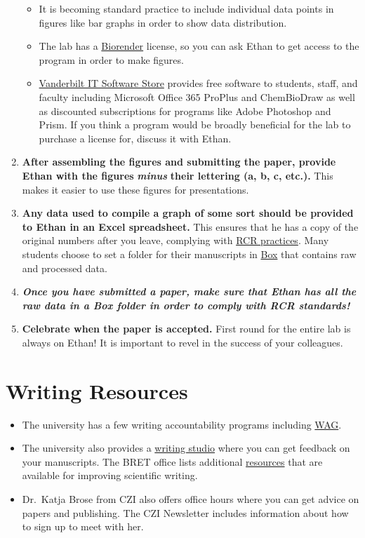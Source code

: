 \documentclass[
]{book}
\begin{document}
\begin{enumerate}
  \begin{itemize}
  \item
    It is becoming standard practice to include individual data points in figures like bar graphs in order to show data distribution.
  \item
    The lab has a \href{https://biorender.com/}{Biorender} license, so you can ask Ethan to get access to the program in order to make figures.
  \item
    \href{https://it.vanderbilt.edu/software-store/index.php}{Vanderbilt IT Software Store} provides free software to students, staff, and faculty including Microsoft Office 365 ProPlus and ChemBioDraw as well as discounted subscriptions for programs like Adobe Photoshop and Prism. If you think a program would be broadly beneficial for the lab to purchase a license for, discuss it with Ethan.
  \end{itemize}
\item
  \textbf{After assembling the figures and submitting the paper, provide Ethan with the figures} \textbf{\emph{minus}} \textbf{their lettering (a, b, c, etc.).} This makes it easier to use these figures for presentations.
\item
  \textbf{Any data used to compile a graph of some sort should be provided to Ethan in an Excel spreadsheet.} This ensures that he has a copy of the original numbers after you leave, complying with \protect\hyperlink{RCR}{RCR practices}. Many students choose to set a folder for their manuscripts in \href{http://vanderbilt.box.com/}{Box} that contains raw and processed data.
\item
  \textbf{\emph{Once you have submitted a paper, make sure that Ethan has all the raw data in a Box folder in order to comply with RCR standards!}}
\item
  \textbf{Celebrate when the paper is accepted.} First round for the entire lab is always on Ethan! It is important to revel in the success of your colleagues.
\end{enumerate}

\hypertarget{writing-resources}{%
\section{Writing Resources}\label{writing-resources}}

\begin{itemize}
\item
  The university has a few writing accountability programs including \href{https://www.vanderbilt.edu/healthydores/writers-accountability-group-wag-workshop/}{WAG}.
\item
  The university also provides a \href{https://www.vanderbilt.edu/writing/}{writing studio} where you can get feedback on your manuscripts. The BRET office lists additional \href{https://medschool.vanderbilt.edu/postdoc/vanderbilt-resources/scientific-writing/}{resources} that are available for improving scientific writing.
\item
  Dr.~Katja Brose from CZI also offers office hours where you can get advice on papers and publishing. The CZI Newsletter includes information about how to sign up to meet with her.
\end{itemize}
\end{document}
